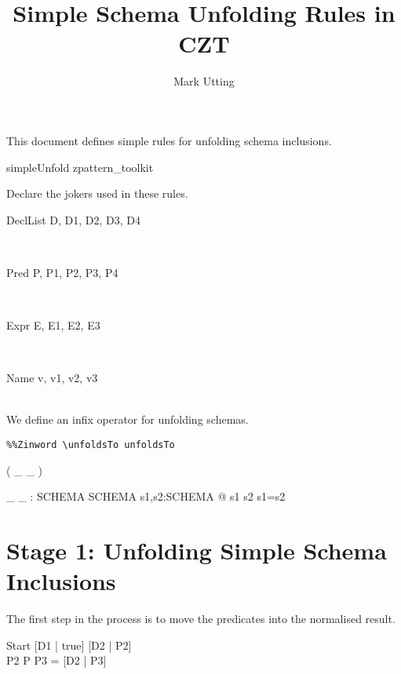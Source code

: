 \documentclass{article}
\title{Simple Schema Unfolding Rules in CZT}
\author{Mark Utting}
\begin{document}
\maketitle

This document defines simple rules for unfolding schema inclusions.

\begin{zsection}
  \SECTION simpleUnfold \parents zpattern\_toolkit
\end{zsection}

Declare the jokers used in these rules.

\begin{zedjoker}{DeclList} D, D1, D2, D3, D4 \end{zedjoker} \\
\begin{zedjoker}{Pred} P, P1, P2, P3, P4 \end{zedjoker} \\
\begin{zedjoker}{Expr} E, E1, E2, E3 \end{zedjoker} \\
\begin{zedjoker}{Name} v, v1, v2, v3 \end{zedjoker} \\

We define an infix operator for unfolding schemas.

\newcommand{\unfoldsTo}{\mathrel{\leadsto}}

\begin{verbatim}
%%Zinword \unfoldsTo unfoldsTo
\end{verbatim}

\begin{zed}
  \relation ( \_ \unfoldsTo \_ )
\end{zed}

\begin{gendef}[SCHEMA]
  \_ \unfoldsTo \_ : SCHEMA \rel SCHEMA
\where
  \forall s1,s2:SCHEMA @ s1 \unfoldsTo s2 \iff s1=s2
\end{gendef}


\section*{Stage 1: Unfolding Simple Schema Inclusions}

The first step in the process is to move the predicates into
the normalised result.
\begin{zedrule}{Start}
   [D1 | true] \unfoldsTo [D2 | P2] \\
   P2 \land P \iff P3
\derives
   [D1 | P] = [D2 | P3]
\end{zedrule}
\end{document}
